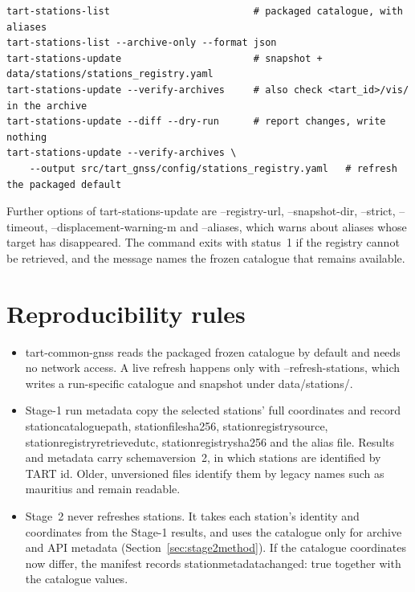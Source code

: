 \documentclass[11pt,a4paper]{article}
\newcommand{\code}[1]{{\ttfamily\def\_{\textunderscore\allowbreak}#1}}
\begin{document}
\begin{lstlisting}
tart-stations-list                         # packaged catalogue, with aliases
tart-stations-list --archive-only --format json
tart-stations-update                       # snapshot + data/stations/stations_registry.yaml
tart-stations-update --verify-archives     # also check <tart_id>/vis/ in the archive
tart-stations-update --diff --dry-run      # report changes, write nothing
tart-stations-update --verify-archives \
    --output src/tart_gnss/config/stations_registry.yaml   # refresh the packaged default
\end{lstlisting}
Further options of \code{tart-stations-update} are \code{--registry-url},
\code{--snapshot-dir}, \code{--strict}, \code{--timeout},
\code{--displacement-warning-m} and \code{--aliases}, which warns about
aliases whose target has disappeared. The command exits with status~1 if the registry
cannot be retrieved, and the message names the frozen catalogue that
remains available.

\section{Reproducibility rules}

\begin{itemize}
\item \code{tart-common-gnss} reads the packaged frozen catalogue by default and
needs no network access. A live refresh happens only with
\code{--refresh-stations}, which writes a run-specific catalogue and
snapshot under \code{data/stations/}.
\item Stage-1 run metadata copy the selected stations' full coordinates and
record \code{station\_catalogue\_path}, \code{station\_file\_sha256},
\code{station\_registry\_source}, \code{station\_registry\_retrieved\_utc},
\code{station\_registry\_sha256} and the alias file. Results and metadata
carry \code{schema\_version}~2, in which stations are identified by TART id.
Older, unversioned files identify them by legacy names such as
\code{mauritius} and remain readable.
\item Stage~2 never refreshes stations. It takes each station's identity and
coordinates from the Stage-1 results, and uses the catalogue only for
archive and API metadata (Section~\ref{sec:stage2method}). If the catalogue
coordinates now differ, the manifest records
\code{station\_metadata\_changed: true} together with the catalogue values.
\end{itemize}
\end{document}
